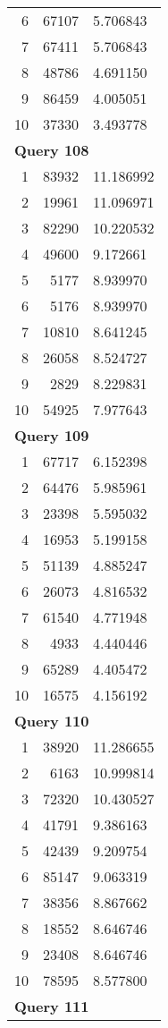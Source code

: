 \begin{longtable}[{p}]{@{}rrp{}@{}}
6 & 67107 & 5.706843 \\
7 & 67411 & 5.706843 \\
8 & 48786 & 4.691150 \\
9 & 86459 & 4.005051 \\
10 & 37330 & 3.493778 \\
\midrule
\multicolumn{3}{l}{\bfseries Query 108} \\
1 & 83932 & 11.186992 \\
2 & 19961 & 11.096971 \\
3 & 82290 & 10.220532 \\
4 & 49600 & 9.172661 \\
5 & 5177 & 8.939970 \\
6 & 5176 & 8.939970 \\
7 & 10810 & 8.641245 \\
8 & 26058 & 8.524727 \\
9 & 2829 & 8.229831 \\
10 & 54925 & 7.977643 \\
\midrule
\multicolumn{3}{l}{\bfseries Query 109} \\
1 & 67717 & 6.152398 \\
2 & 64476 & 5.985961 \\
3 & 23398 & 5.595032 \\
4 & 16953 & 5.199158 \\
5 & 51139 & 4.885247 \\
6 & 26073 & 4.816532 \\
7 & 61540 & 4.771948 \\
8 & 4933 & 4.440446 \\
9 & 65289 & 4.405472 \\
10 & 16575 & 4.156192 \\
\midrule
\multicolumn{3}{l}{\bfseries Query 110} \\
1 & 38920 & 11.286655 \\
2 & 6163 & 10.999814 \\
3 & 72320 & 10.430527 \\
4 & 41791 & 9.386163 \\
5 & 42439 & 9.209754 \\
6 & 85147 & 9.063319 \\
7 & 38356 & 8.867662 \\
8 & 18552 & 8.646746 \\
9 & 23408 & 8.646746 \\
10 & 78595 & 8.577800 \\
\midrule
\multicolumn{3}{l}{\bfseries Query 111} \\

\end{longtable}
